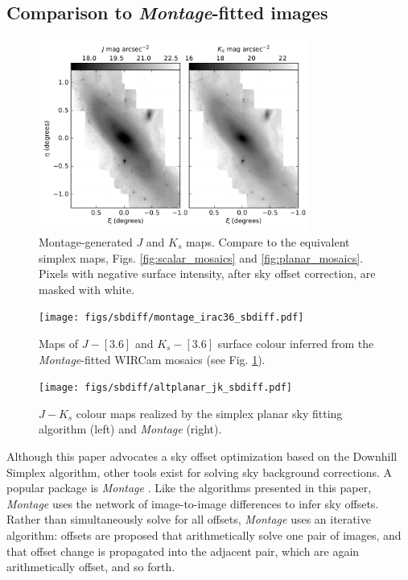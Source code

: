 \documentclass[iop]{emulateapj}
\newcommand{\sw}[1]{\textit{#1}} %
\begin{document}
\subsection{Comparison to \sw{Montage}-fitted images}

\begin{figure}[t]
    \centering
        \includegraphics[width=3.5in]{figs/montage_planar_mosaics.pdf}
    \caption{Montage-generated $J$ and $K_s$ maps. Compare to the equivalent simplex maps, Figs. \ref{fig:scalar_mosaics} and \ref{fig:planar_mosaics}. Pixels with negative surface intensity, after sky offset correction, are masked with white.}
    \label{fig:montage_planar_mosaics}
\end{figure}

\begin{figure}[t]
    \centering
        \texttt{[image: figs/sbdiff/montage\_irac36\_sbdiff.pdf]}
    \caption{Maps of $J-[3.6]$ and $K_s-[3.6]$ surface colour inferred from the \sw{Montage}-fitted WIRCam mosaics (see Fig. \ref{fig:montage_planar_mosaics}).}
    \label{fig:montage_irac36_sbdiff}
\end{figure}

\begin{figure}[t]
    \centering
        \texttt{[image: figs/sbdiff/altplanar\_jk\_sbdiff.pdf]}
    \caption{$J-K_s$ colour maps realized by the simplex planar sky fitting algorithm (left) and \sw{Montage} (right).}
    \label{fig:altplanar_jk_sbdiff}
\end{figure}


Although this paper advocates a sky offset optimization based on the \cite{Nelder:1965} Downhill Simplex algorithm, other tools exist for solving sky background corrections. A popular package is \sw{Montage} \citep{Berriman:2008}. Like the algorithms presented in this paper, \sw{Montage} uses the network of image-to-image differences to infer sky offsets. Rather than simultaneously solve for all offsets, \sw{Montage} uses an iterative algorithm: offsets are proposed that arithmetically solve one pair of images, and that offset change is propagated into the adjacent pair, which are again arithmetically offset, and so forth.
\end{document}
